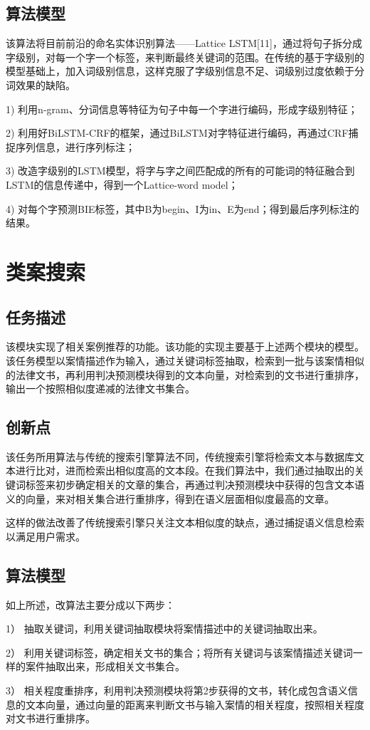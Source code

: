 \subsection{算法模型}

该算法将目前前沿的命名实体识别算法——Lattice LSTM[11]，通过将句子拆分成字级别，对每一个字一个标签，来判断最终关键词的范围。在传统的基于字级别的模型基础上，加入词级别信息，这样克服了字级别信息不足、词级别过度依赖于分词效果的缺陷。

1)	利用n-gram、分词信息等特征为句子中每一个字进行编码，形成字级别特征；

2)	利用好BiLSTM-CRF的框架，通过BiLSTM对字特征进行编码，再通过CRF捕捉序列信息，进行序列标注；

3)	改造字级别的LSTM模型，将字与字之间匹配成的所有的可能词的特征融合到LSTM的信息传递中，得到一个Lattice-word model；

4)	对每个字预测BIE标签，其中B为begin、I为in、E为end；得到最后序列标注的结果。



\section{类案搜索}
\subsection{任务描述}
该模块实现了相关案例推荐的功能。该功能的实现主要基于上述两个模块的模型。该任务模型以案情描述作为输入，通过关键词标签抽取，检索到一批与该案情相似的法律文书，再利用判决预测模块得到的文本向量，对检索到的文书进行重排序，输出一个按照相似度递减的法律文书集合。

\subsection{创新点}
该任务所用算法与传统的搜索引擎算法不同，传统搜索引擎将检索文本与数据库文本进行比对，进而检索出相似度高的文本段。在我们算法中，我们通过抽取出的关键词标签来初步确定相关的文章的集合，再通过判决预测模块中获得的包含文本语义的向量，来对相关集合进行重排序，得到在语义层面相似度最高的文章。

这样的做法改善了传统搜索引擎只关注文本相似度的缺点，通过捕捉语义信息检索以满足用户需求。

\subsection{算法模型}
如上所述，改算法主要分成以下两步：

1）	抽取关键词，利用关键词抽取模块将案情描述中的关键词抽取出来。

2）	利用关键词标签，确定相关文书的集合；将所有关键词与该案情描述关键词一样的案件抽取出来，形成相关文书集合。

3）	相关程度重排序，利用判决预测模块将第2步获得的文书，转化成包含语义信息的文本向量，通过向量的距离来判断文书与输入案情的相关程度，按照相关程度对文书进行重排序。



